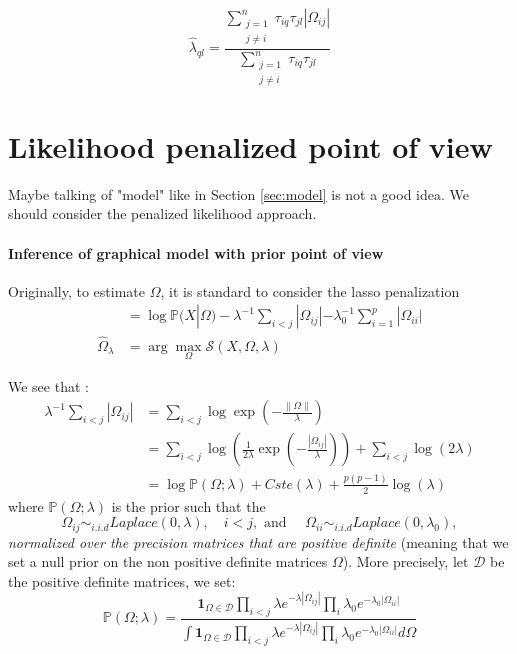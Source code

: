 \documentclass[10pt]{article}
\begin{document}
\[ \boxed{\hat{\lambda}_{ql} = \frac{\sum_{\substack{j = 1 \\  j\neq i}}^n  \tau_{iq}\tau_{jl} |\Omega_{ij}|}{\sum_{\substack{j = 1 \\  j\neq i}}^n \tau_{iq}\tau_{jl}}   }\]




\section{Likelihood penalized point of view}

Maybe talking of "model"  like in Section  \ref{sec:model} is not a good idea. 
We should consider the penalized likelihood approach. 

\paragraph{Inference of graphical model with prior point of view}
Originally,  to estimate $\Omega$, it is standard to consider the lasso penalization
\begin{align*}
 &=   \log \mathbb{P}(X | \Omega) - \lambda^{-1} \sum_{i < j} |\Omega_{ij}| -  \lambda_0^{-1}  \sum_{i=1}^p|\Omega_{ii}| \\
\widehat \Omega_\lambda  &= \arg \max_{\Omega} \mathcal{S}(X,\Omega,\lambda) 
\end{align*}

We see that : 
\begin{align*}
  \lambda^{-1} \sum_{i < j} |\Omega_{ij}| &= \sum_{i < j}  \log \exp\left( - \frac{ \|\Omega\|}{\lambda}\right)\\
&=    \sum_{i < j}  \log\left(\frac{1}{2 \lambda} \exp\left( - \frac{ |\Omega_{ij}| }{\lambda}\right) \right) +   \sum_{i < j} \log\left(2\lambda\right) \\
&=  \log \mathbb{P}(\Omega;\lambda) + Cste(\lambda) + \frac{p(p-1)}{2} \log(\lambda) 
\end{align*}
where $ \mathbb{P}(\Omega;\lambda) $ is the prior such that the $$\Omega_{ij} \sim_{i.i.d} Laplace(0,\lambda), \quad i< j, \mbox{ and } \quad \Omega_{ii} \sim_{i.i.d} Laplace(0,\lambda_0),$$
\emph{normalized over the precision matrices that are positive definite} (meaning that we set a null prior on the non positive definite matrices $\Omega$). More precisely, let $\mathcal{D}$ be the positive definite matrices, we set: 
$$ \mathbb{P}(\Omega;\lambda)  =\frac{\mathbf{1}_{\Omega \in \mathcal{D}}\prod_{i<j} \lambda e^{-\lambda | \Omega_{ij}|} \prod_{i} \lambda_0 e^{-\lambda_0 | \Omega_{ii}|}}{\int \mathbf{1}_{\Omega \in \mathcal{D}}\prod_{i<j} \lambda e^{-\lambda | \Omega_{ij}|} \prod_{i} \lambda_0 e^{-\lambda_0 | \Omega_{ii}|} d\Omega} $$
\end{document}
